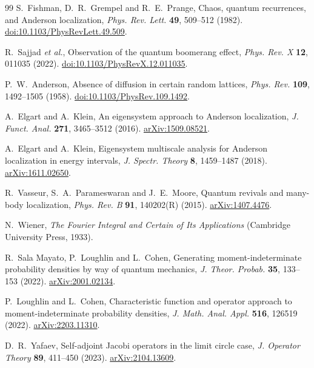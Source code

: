\documentclass[10pt]{article}
\theoremstyle{definition}
\begin{document}
\begin{thebibliography}{99}
S.~Fishman, D.~R.~Grempel and R.~E.~Prange,
Chaos, quantum recurrences, and Anderson localization,
\emph{Phys. Rev. Lett.} \textbf{49}, 509--512 (1982).
\href{https://doi.org/10.1103/PhysRevLett.49.509}
{doi:10.1103/PhysRevLett.49.509}.

R.~Sajjad \emph{et al.},
Observation of the quantum boomerang effect,
\emph{Phys. Rev. X} \textbf{12}, 011035 (2022).
\href{https://doi.org/10.1103/PhysRevX.12.011035}
{doi:10.1103/PhysRevX.12.011035}.

P.~W.~Anderson,
Absence of diffusion in certain random lattices,
\emph{Phys. Rev.} \textbf{109}, 1492--1505 (1958).
\href{https://doi.org/10.1103/PhysRev.109.1492}
{doi:10.1103/PhysRev.109.1492}.

A.~Elgart and A.~Klein,
An eigensystem approach to Anderson localization,
\emph{J. Funct. Anal.} \textbf{271}, 3465--3512 (2016).
\href{https://arxiv.org/abs/1509.08521}{arXiv:1509.08521}.

A.~Elgart and A.~Klein,
Eigensystem multiscale analysis for Anderson localization in energy
intervals,
\emph{J. Spectr. Theory} \textbf{8}, 1459--1487 (2018).
\href{https://arxiv.org/abs/1611.02650}{arXiv:1611.02650}.

R.~Vasseur, S.~A.~Parameswaran and J.~E.~Moore,
Quantum revivals and many-body localization,
\emph{Phys. Rev. B} \textbf{91}, 140202(R) (2015).
\href{https://arxiv.org/abs/1407.4476}{arXiv:1407.4476}.

N.~Wiener,
\emph{The Fourier Integral and Certain of Its Applications}
(Cambridge University Press, 1933).

R.~Sala Mayato, P.~Loughlin and L.~Cohen,
Generating moment-indeterminate probability densities by way of quantum
mechanics,
\emph{J. Theor. Probab.} \textbf{35}, 133--153 (2022).
\href{https://arxiv.org/abs/2001.02134}{arXiv:2001.02134}.

P.~Loughlin and L.~Cohen,
Characteristic function and operator approach to moment-indeterminate
probability densities,
\emph{J. Math. Anal. Appl.} \textbf{516}, 126519 (2022).
\href{https://arxiv.org/abs/2203.11310}{arXiv:2203.11310}.

D.~R.~Yafaev,
Self-adjoint Jacobi operators in the limit circle case,
\emph{J. Operator Theory} \textbf{89}, 411--450 (2023).
\href{https://arxiv.org/abs/2104.13609}{arXiv:2104.13609}.


\end{thebibliography}
\end{document}
